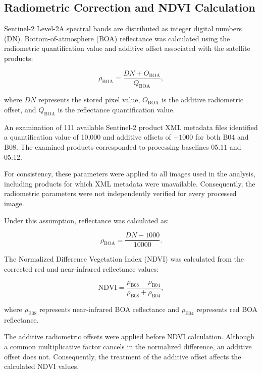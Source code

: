 \subsection{Radiometric Correction and NDVI Calculation}
\label{subsec:ndvi-method}

Sentinel-2 Level-2A spectral bands are distributed
as integer digital numbers (DN). Bottom-of-atmosphere
(BOA) reflectance was calculated using the
radiometric quantification value and additive
offset associated with the satellite products:

\begin{equation}
	\rho_{\mathrm{BOA}} =
	\frac{DN + O_{\mathrm{BOA}}}{Q_{\mathrm{BOA}}},
	\label{eq:boa-reflectance}
\end{equation}

where $DN$ represents the stored pixel value,
$O_{\mathrm{BOA}}$ is the additive radiometric
offset, and $Q_{\mathrm{BOA}}$ is the reflectance
quantification value.

An examination of 111 available Sentinel-2
product XML metadata files identified a
quantification value of 10,000 and additive
offsets of $-1000$ for both B04 and B08.
The examined products corresponded to
processing baselines 05.11 and 05.12.

For consistency, these parameters were applied
to all images used in the analysis, including
products for which XML metadata were unavailable.
Consequently, the radiometric parameters were
not independently verified for every processed
image.

Under this assumption, reflectance was calculated
as:

\begin{equation}
	\rho_{\mathrm{BOA}} =
	\frac{DN - 1000}{10000}.
	\label{eq:boa-correction}
\end{equation}

The Normalized Difference Vegetation Index
(NDVI) was calculated from the corrected red
and near-infrared reflectance values:

\begin{equation}
	\mathrm{NDVI} =
	\frac{\rho_{\mathrm{B08}}-\rho_{\mathrm{B04}}}
	{\rho_{\mathrm{B08}}+\rho_{\mathrm{B04}}},
	\label{eq:ndvi}
\end{equation}

where $\rho_{\mathrm{B08}}$ represents
near-infrared BOA reflectance and
$\rho_{\mathrm{B04}}$ represents red BOA
reflectance.

The additive radiometric offsets were applied
before NDVI calculation. Although a common
multiplicative factor cancels in the normalized
difference, an additive offset does not.
Consequently, the treatment of the additive
offset affects the calculated NDVI values.

